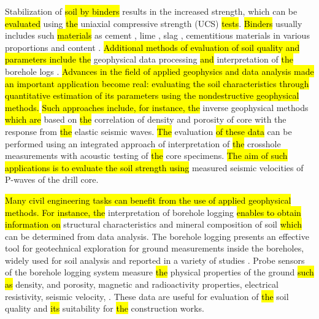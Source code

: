 \documentclass[USenglish,twocolumn]{article}
\begin{document}
Stabilization of \hl{soil by binders }results in the increased strength,\hl{ }which can be \hl{evaluated} using \hl{the }uniaxial compressive strength (UCS) \hl{tests}. \hl{Binders }usually includes such \hl{materials} as cement \cite{Lindh2004,HORPIBULSUK20102011}, lime \cite{OKYAY201034,JAUBERTHIE2010395}, slag \cite{Lindh2021a}, cementitious materials \cite{YOON20102322} in various proportions and content \cite{Lindh2001}. \hl{Additional methods of evaluation of soil quality and parameters include the} geophysical data processing \hl{and} interpretation of \hl{the }borehole logs  \cite{LIU2022107048,Rydenetal2016,COMINA2021106278}. \hl{Advances in the field of applied geophysics and data analysis made an important application become real: evaluating the soil characteristics through quantitative estimation of its parameters using the nondestructive geophysical methods. }\hl{Such approaches include, for instance, the }inverse geophysical methods \hl{which are }based on \hl{the }correlation of density and porosity of core with the response from \hl{the }elastic seismic waves. \hl{The} evaluation \hl{of these data }can be performed using an integrated approach of interpretation of \hl{the }crosshole measurements with acoustic testing of \hl{the }core specimens. \hl{ The aim of such applications is to evaluate the soil strength using} measured seismic velocities of P-waves of the drill core. 

\hl{Many civil engineering tasks can benefit from the use of applied geophysical methods. For instance, the }interpretation of borehole logging \hl{enables to obtain information on} structural characteristics and mineral composition of soil \hl{which }can be determined from {data analysis}. The borehole logging presents an effective tool for geotechnical exploration for ground measurements inside the boreholes, widely used for soil analysis and reported in a variety of studies \cite{KALERIS2015135,DIAS2020107099,YU2022127817,YU2021126010}. Probe sensors of the borehole logging system measure \hl{the }physical properties of the ground \hl{such as} density, and porosity, magnetic and radioactivity properties, electrical resistivity, seismic velocity, 
\cite{KILLEEN2015447}. These data are useful for evaluation of \hl{the }soil quality and \hl{its }suitability for \hl{the }construction works.
\end{document}
